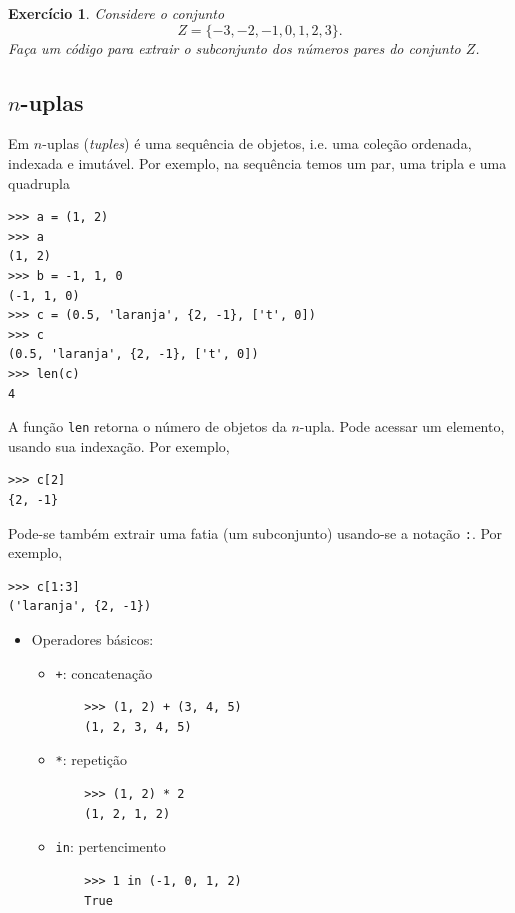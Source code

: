 \documentclass[12pt]{article}
\newtheorem{exr}{Exercício}[section]
\begin{document}
\begin{exr}
  Considere o conjunto
  \begin{equation}
    Z = \{-3, -2, -1, 0, 1, 2, 3\}.
  \end{equation}
  Faça um código {\python} para extrair o subconjunto dos números pares do conjunto $Z$.
\end{exr}

\subsection{$n$-uplas}

Em {\python} $n$-uplas ({\it tuples}) é uma sequência de objetos, i.e. uma coleção ordenada, indexada e imutável. Por exemplo, na sequência temos um par, uma tripla e uma quadrupla
\begin{lstlisting}
>>> a = (1, 2)
>>> a
(1, 2)
>>> b = -1, 1, 0
(-1, 1, 0)
>>> c = (0.5, 'laranja', {2, -1}, ['t', 0])
>>> c
(0.5, 'laranja', {2, -1}, ['t', 0])
>>> len(c)
4
\end{lstlisting}
A função \lstinline+len+ retorna o número de objetos da $n$-upla. Pode acessar um elemento, usando sua indexação. Por exemplo,
\begin{lstlisting}
>>> c[2]
{2, -1}
\end{lstlisting}
Pode-se também extrair uma fatia (um subconjunto) usando-se a notação \lstinline+:+. Por exemplo,
\begin{lstlisting}
>>> c[1:3]
('laranja', {2, -1})
\end{lstlisting}

\begin{itemize}
\item Operadores básicos:
  \begin{itemize}
  \item[] \lstinline-+-: concatenação
    \begin{lstlisting}
    >>> (1, 2) + (3, 4, 5)
    (1, 2, 3, 4, 5)
    \end{lstlisting}
  \item[] \lstinline+*+: repetição
    \begin{lstlisting}
    >>> (1, 2) * 2
    (1, 2, 1, 2)
    \end{lstlisting}
  \item[] \lstinline+in+: pertencimento
    \begin{lstlisting}
    >>> 1 in (-1, 0, 1, 2)
    True
    \end{lstlisting}
  \end{itemize}
\end{itemize}
\end{document}
